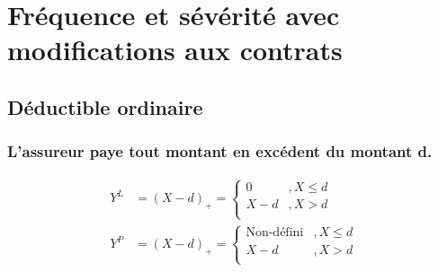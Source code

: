 \documentclass[french, landscape]{article}
\begin{document}
\begin{multicols*}{3}
\begin{itemize}
\end{itemize}

\setcounter{section}{7}
\section{Fréquence et sévérité avec modifications aux contrats}
\subsection*{Déductible ordinaire}

\subsubsection*{L'assureur paye tout montant en excédent du montant d.}
\begin{align*}
Y^L &= (X-d)_+ = 
	\begin{cases}
		0		& , X \leq d \\
		X - d	& , X > d \\
	\end{cases} \\
Y^P &= (X-d)_+ = 
	\begin{cases}
		\text{Non-défini}	& , X \leq d \\
		X - d				& , X > d \\
	\end{cases}
\end{align*}


\end{multicols*}
\end{document}
